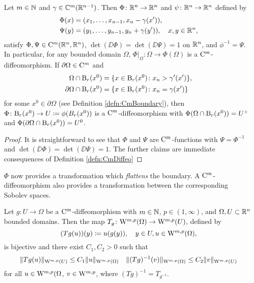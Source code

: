 \begin{lem}
  Let $m \in \mathbb{N}$ and $\gamma \in \mathbb{C}^m(\mathbb{R}^{n - 1})$.
  Then $\Phi \colon \mathbb{R}^n \to \mathbb{R}^n$ and $\psi \colon \mathbb{R}^n \to \mathbb{R}^n$ defined by
  \begin{align*}
    \Phi(x) &= (x_1,\dots,x_{n - 1}, x_n - \gamma(x')),\\
    \Psi(y) &= (y_1,\dots,y_{n - 1}, y_n + \gamma(y')), \quad x,y \in \mathbb{R}^n,
  \end{align*}
  satisfy $\Phi,\Psi \in \mathrm{C}^m(\mathbb{R}^n,\mathbb{R}^n)$, $\det(\DD\Phi) = \det(\DD \Psi) =1$ on $\mathbb{R}^n$, and $\phi^{-1} = \Psi$.
  In particular, for any bounded domain $\Omega$, $\Phi|_\Omega \colon \Omega \to \Phi(\Omega)$ is a $\mathrm{C}^m$-diffeomorphism.
  If $\partial \Omega \in \mathrm{C}^m$ and 
  \begin{align*}
    \Omega \cap \mathrm{B}_r(x^0) &= \{ x \in \mathrm{B}_r(x^0) \colon x_n > \gamma'(x')\},\\
    \partial \Omega \cap \mathrm{B}_r(x^0) &= \{ x \in \mathrm{B}_r(x^0) \colon x_n = \gamma(x')\}
  \end{align*}
  for some $x^0 \in \partial \Omega$ (see Definition \ref{defn:CmBoundary}), then $\Phi\colon \mathrm{B}_r(x^0) \to U \coloneqq \phi(B_r(x^0))$ is a $\mathrm{C}^m$-diffeomorphism with $\Phi(\Omega \cap \mathrm{B}_r(x^0)) = U^+$ and $\Phi(\partial\Omega \cap \mathrm{B}_r(x^0)) = U^0$.
\end{lem}

\begin{proof}
  It is straightforward to see that $\Phi$ and $\Psi$ are $\mathrm{C}^m$-functions with $\Psi = \Phi^{-1}$ and $\det(\DD\Phi) = \det(\DD\Psi) = 1$.
  The further claims are immediate consequences of Definition \ref{defn:CmDiffeo}
\end{proof}

$\Phi$ now provides a transformation which \emph{flattens} the boundary.
A $\mathrm{C}^m$-diffeomorphism also provides a transformation between the corresponding Sobolev spaces.

\begin{prop}
  Let $g \colon U \to \Omega$ be a $\mathrm{C}^m$-diffeomorphism with $m \in \mathbb{N}$, $p \in (1,\infty)$, and $\Omega,U \subset \mathbb{R}^n$ bounded domains.
  Then the map $T_g \colon \mathrm{W}^{m,p}(\Omega) \to \mathrm{W}^{m,p}(U)$, defined by
  $$
  (Tg(u))(y) \coloneqq u(g(y)), \quad y \in U, u \in \mathrm{W}^{m,p}(\Omega),
  $$
  is bijective and there exist $C_1, C_2 > 0$ such that
  $$
  \|Tg(u)\|_{\mathrm{W}^{m,p}(U)} \leq C_1 \|u\|_{\mathrm{W}^{m,p}(\Omega)}
  \quad 
  \|(Tg)^{-1}(v)\|_{\mathrm{W}^{m,p}(\Omega)} \leq C_2 \|v\|_{\mathrm{W}^{m,p}(U)}
  $$
  for all $u \in \mathrm{W}^{m,p}(\Omega$, $v \in \mathrm{W}^{m,p}$, where $(Tg)^{-1} = T_{g^{-1}}$.
\end{prop}

